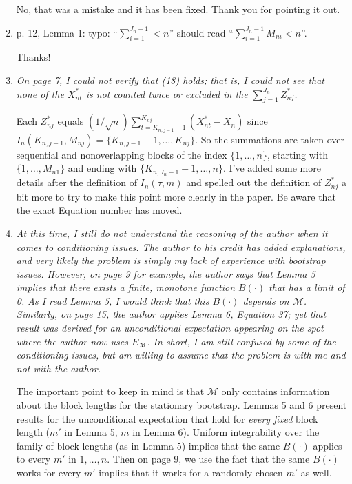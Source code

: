 \documentclass[12pt]{article}
\begin{document}
\begin{enumerate}
  No, that was a mistake and it has been fixed. Thank you for pointing
  it out.

\item p. 12, Lemma 1: typo: ``$\sum_{i=1}^{J_n-1} < n$'' should read
  ``$\sum_{i=1}^{J_n-1} M_{ni} < n$''.

  Thanks!

\item \textit{On page 7, I could not verify that (18) holds; that is,
    I could not see that none of the $X_{nt}^*$ is not counted twice
    or excluded in the $\sum_{j=1}^{J_n} Z_{nj}^*$.}

  Each $Z_{nj}^*$ equals $(1/\sqrt{n}) \sum_{t=K_{n,j-1}+1}^{K_{nj}}
  (X_{nt}^* - \bar X_n)$ since $I_n(K_{n,j-1}, M_{nj}) =
  \{K_{n,j-1}+1,\dots,K_{nj}\}$. So the summations are taken over
  sequential and nonoverlapping blocks of the index $\{1,\dots,n\}$,
  starting with $\{1,\dots,M_{n1}\}$ and ending with
  $\{K_{n,J_n-1}+1,\dots,n\}$.  I've added some more details after the
  definition of $I_n(\tau,m)$ and spelled out the
  definition of $Z_{nj}^*$ a bit more to try to make
  this point more clearly in the paper. Be aware that the exact
  Equation number has moved.

\item \textit{At this time, I still do not understand the reasoning of
    the author when it comes to conditioning issues. The author to his
    credit has added explanations, and very likely the problem is
    simply my lack of experience with bootstrap issues. However, on
    page 9 for example, the author says that Lemma 5 implies that
    there exists a finite, monotone function $B(\cdot)$ that has a
    limit of 0. As I read Lemma 5, I would think that this $B(\cdot)$
    depends on $\mathcal{M}$. Similarly, on page 15, the author
    applies Lemma 6, Equation 37; yet that result was derived for an
    unconditional expectation appearing on the spot where the author
    now uses $E_{\mathcal{M}}$. In short, I am still confused by some
    of the conditioning issues, but am willing to assume that the
    problem is with me and not with the author.}

  The important point to keep in mind is that $\mathcal{M}$ only
  contains information about the block lengths for the stationary
  bootstrap. Lemmas 5 and 6 present results for the unconditional
  expectation that hold for \emph{every fixed} block length ($m'$ in
  Lemma 5, $m$ in Lemma 6). Uniform integrability over the family of
  block lengths (as in Lemma 5) implies that the same $B(\cdot)$
  applies to every $m'$ in $1,\dots,n$. Then on page 9, we use the
  fact that the same $B(\cdot)$ works for every $m'$ implies that it
  works for a randomly chosen $m'$ as well.


\end{enumerate}
\end{document}
